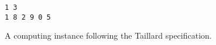 \begin{figure}[htp!]
    \centering
    \caption{A computing instance following the Taillard specification.}
    \label{fig:taillard}
    \vspace{-.5cm}
    \begin{Verbatim}[frame=single]
1 3
1 8 2 9 0 5
    \end{Verbatim}
\end{figure}
